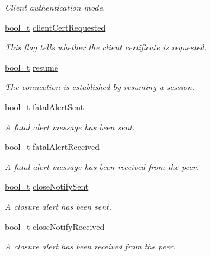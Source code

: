 \begin{DoxyCompactItemize}
\begin{DoxyCompactList}\small\item\em Client authentication mode. \end{DoxyCompactList}\item 
\hyperlink{compiler__port_8h_a812d16e5494522586b3784e55d479912}{bool\+\_\+t} \hyperlink{struct__TlsContext_a62a4d809ef9653728ad46a295a107bf6}{client\+Cert\+Requested}
\begin{DoxyCompactList}\small\item\em This flag tells whether the client certificate is requested. \end{DoxyCompactList}\item 
\hyperlink{compiler__port_8h_a812d16e5494522586b3784e55d479912}{bool\+\_\+t} \hyperlink{struct__TlsContext_a8147a82cb2fe5da224fb4f6a8c6357f3}{resume}
\begin{DoxyCompactList}\small\item\em The connection is established by resuming a session. \end{DoxyCompactList}\item 
\hyperlink{compiler__port_8h_a812d16e5494522586b3784e55d479912}{bool\+\_\+t} \hyperlink{struct__TlsContext_a9cca316cd1de5c20145fc48aa0aa54a7}{fatal\+Alert\+Sent}
\begin{DoxyCompactList}\small\item\em A fatal alert message has been sent. \end{DoxyCompactList}\item 
\hyperlink{compiler__port_8h_a812d16e5494522586b3784e55d479912}{bool\+\_\+t} \hyperlink{struct__TlsContext_aa5fc7dcae4c69ec2195bb08b1c035475}{fatal\+Alert\+Received}
\begin{DoxyCompactList}\small\item\em A fatal alert message has been received from the peer. \end{DoxyCompactList}\item 
\hyperlink{compiler__port_8h_a812d16e5494522586b3784e55d479912}{bool\+\_\+t} \hyperlink{struct__TlsContext_ac84f53bec72e0ba48ab25ca9fd28bcd8}{close\+Notify\+Sent}
\begin{DoxyCompactList}\small\item\em A closure alert has been sent. \end{DoxyCompactList}\item 
\hyperlink{compiler__port_8h_a812d16e5494522586b3784e55d479912}{bool\+\_\+t} \hyperlink{struct__TlsContext_a7e0c52a9f91c03d5bc44270e4092efea}{close\+Notify\+Received}
\begin{DoxyCompactList}\small\item\em A closure alert has been received from the peer. \end{DoxyCompactList}\item 

\end{DoxyCompactItemize}
